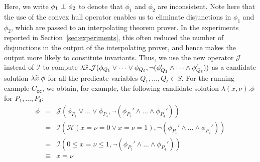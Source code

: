 Here, we write \(\phi_1 \ \bot\  \phi_2\) to denote that \(\phi_1\) and
\(\phi_2\) are inconsistent.  Note here that the use of the convex hull
operator enables us to eliminate disjunctions in \(\phi_1\) and
\(\phi_2\), which are passed to an interpolating theorem prover.
In the experiments reported in Section~\ref{sec:experiments}, this often
reduced the number of disjunctions in the output of the interpolating
prover, and hence makes the output more likely to constitute invariants.
%
Thus, we use the new operator \(\mathcal{J}\) instead of \(\mathcal{I}\)
to compute \(\lambda \widetilde{x}. \mathcal{J}(\phi_{Q_1} \lor \dots\lor
\phi_{Q_{\ell}},\neg (\phi_{Q_1}' \land \dots \land\phi_{Q_{\ell}}'))\)
as a candidate solution \(\lambda \widetilde{x}. \phi\) for all the predicate
variables \(Q_1,\dots,Q_{\ell} \in S\).  For the running example
\(C_{\texttt{cc}}\), we obtain, for example, the following candidate
solution \(\lambda (x, \nu). \phi\) for \(P_1,\dots,P_4\):
\vspace{-5pt}
\[
\begin{array}{rcl}
\phi&=& \mathcal{J}(\phi_{P_1} \lor \dots \lor \phi_{P_4},\neg (\phi_{P_1}' \land \dots \land \phi_{P_4}')) \\
&=& \mathcal{I}(\mathcal{H}(x=\nu=0 \lor x=\nu=1),\neg (\phi_{P_1}' \land \dots \land \phi_{P_4}')) \\
&=& \mathcal{I}(0 \leq x=\nu \leq 1,\neg (\phi_{P_1}' \land \dots \land \phi_{P_4}')) \\
&\equiv& x=\nu
\end{array}
\]


